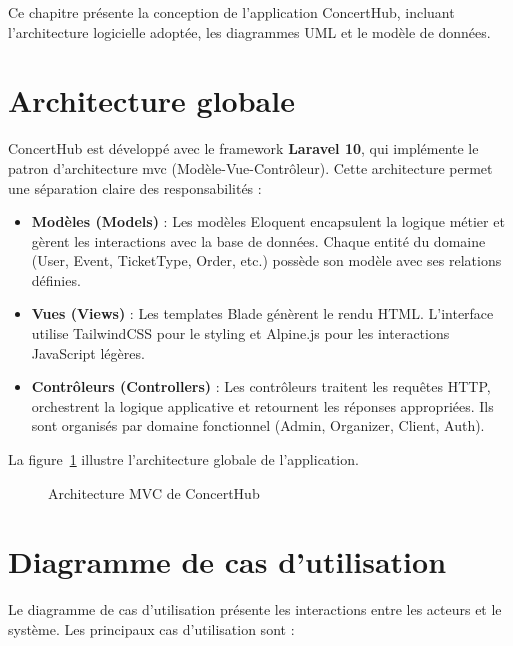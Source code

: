 \documentclass[a4paper,12pt,twoside]{report}
\begin{document}
Ce chapitre présente la conception de l'application ConcertHub, incluant l'architecture logicielle adoptée, les diagrammes UML et le modèle de données.

\section{Architecture globale}

ConcertHub est développé avec le framework \textbf{Laravel 10}, qui implémente le patron d'architecture \gls{mvc} (Modèle-Vue-Contrôleur). Cette architecture permet une séparation claire des responsabilités :

\begin{itemize}
    \item \textbf{Modèles (Models)} : Les modèles Eloquent encapsulent la logique métier et gèrent les interactions avec la base de données. Chaque entité du domaine (User, Event, TicketType, Order, etc.) possède son modèle avec ses relations définies.
    
    \item \textbf{Vues (Views)} : Les templates Blade génèrent le rendu HTML. L'interface utilise TailwindCSS pour le styling et Alpine.js pour les interactions JavaScript légères.
    
    \item \textbf{Contrôleurs (Controllers)} : Les contrôleurs traitent les requêtes HTTP, orchestrent la logique applicative et retournent les réponses appropriées. Ils sont organisés par domaine fonctionnel (Admin, Organizer, Client, Auth).
\end{itemize}

La figure~\ref{fig:architecture} illustre l'architecture globale de l'application.

\begin{figure}[!h]
    \centering
    \caption{Architecture MVC de ConcertHub}
    \label{fig:architecture}
\end{figure}

\section{Diagramme de cas d'utilisation}

Le diagramme de cas d'utilisation présente les interactions entre les acteurs et le système. Les principaux cas d'utilisation sont :
\end{document}
